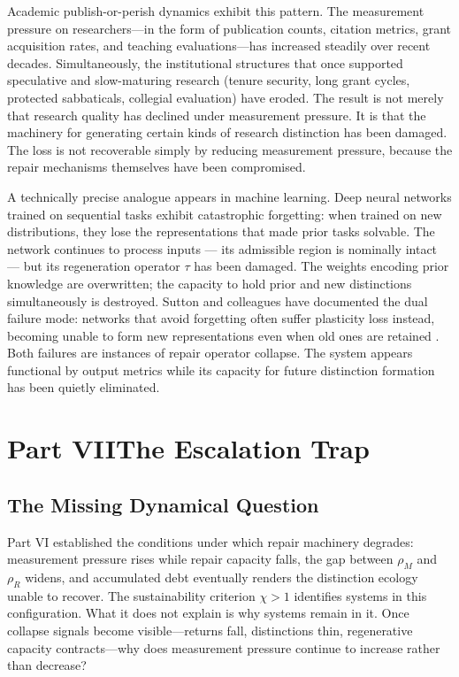 \documentclass[12pt, a4paper]{article}
\theoremstyle{flyxion}
\newcommand{\rhoM}{\rho_{M}}
\newcommand{\rhoR}{\rho_{R}}
\begin{document}
Academic publish-or-perish dynamics exhibit this pattern. The measurement pressure on researchers---in the form of publication counts, citation metrics, grant acquisition rates, and teaching evaluations---has increased steadily over recent decades. Simultaneously, the institutional structures that once supported speculative and slow-maturing research (tenure security, long grant cycles, protected sabbaticals, collegial evaluation) have eroded. The result is not merely that research quality has declined under measurement pressure. It is that the machinery for generating certain kinds of research distinction has been damaged. The loss is not recoverable simply by reducing measurement pressure, because the repair mechanisms themselves have been compromised.

A technically precise analogue appears in machine learning. Deep neural networks trained on sequential tasks exhibit catastrophic forgetting: when trained on new distributions, they lose the representations that made prior tasks solvable. The network continues to process inputs --- its admissible region is nominally intact --- but its regeneration operator $\tau$ has been damaged. The weights encoding prior knowledge are overwritten; the capacity to hold prior and new distinctions simultaneously is destroyed. Sutton and colleagues have documented the dual failure mode: networks that avoid forgetting often suffer plasticity loss instead, becoming unable to form new representations even when old ones are retained \cite{sutton2019}. Both failures are instances of repair operator collapse. The system appears functional by output metrics while its capacity for future distinction formation has been quietly eliminated.


\section*{Part VII\quad The Escalation Trap}

\subsection*{The Missing Dynamical Question}

Part VI established the conditions under which repair machinery degrades: measurement pressure rises while repair capacity falls, the gap between $\rhoM$ and $\rhoR$ widens, and accumulated debt eventually renders the distinction ecology unable to recover. The sustainability criterion $\chi > 1$ identifies systems in this configuration. What it does not explain is why systems remain in it. Once collapse signals become visible---returns fall, distinctions thin, regenerative capacity contracts---why does measurement pressure continue to increase rather than decrease?
\end{document}

